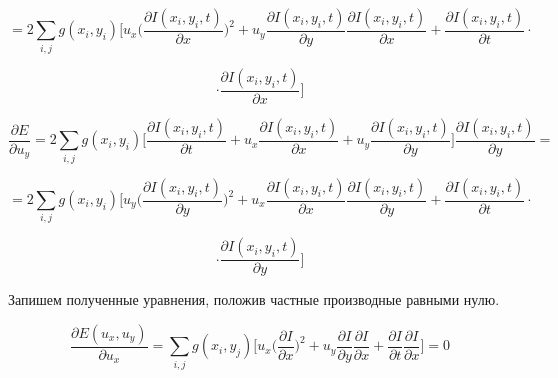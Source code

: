 \documentclass[a4paper,14pt]{extarticle}
\begin{document}
\begin{displaymath}
    =2\sum_{i,j}g(x_i,y_i)\Big[u_x\Big(\frac{\partial I(x_i,y_i,t)}{\partial x}\Big)^2 + u_y\frac{\partial I(x_i,y_i,t)}{\partial y}\frac{\partial I(x_i,y_i,t)}{\partial x} + \frac{\partial I(x_i,y_i,t)}{\partial t} \cdot
\end{displaymath}

\begin{displaymath}
    \cdot \frac{\partial I(x_i,y_i,t)}{\partial x}\Big]
\end{displaymath}




\begin{equation}
    \frac{\partial E}{\partial u_y} = 2\sum_{i,j} g(x_i,y_i)\Big[\frac{\partial I(x_i,y_i,t)}{\partial t} + u_x \frac{\partial I(x_i,y_i,t)}{\partial x} + u_y \frac{\partial I(x_i,y_i,t)}{\partial y}\Big] \frac{\partial I(x_i,y_i,t)}{\partial y}= 
\end{equation}

\begin{displaymath}
    =2\sum_{i,j}g(x_i,y_i)\Big[u_y\Big(\frac{\partial I(x_i,y_i,t)}{\partial y}\Big)^2 + u_x\frac{\partial I(x_i,y_i,t)}{\partial x}\frac{\partial I(x_i,y_i,t)}{\partial y} + \frac{\partial I(x_i,y_i,t)}{\partial t} \cdot
\end{displaymath}

\begin{displaymath}
    \cdot \frac{\partial I(x_i,y_i,t)}{\partial y}\Big]
\end{displaymath}

Запишем полученные уравнения, положив частные производные равными нулю.

\begin{displaymath}
   \frac{\partial E(u_x,u_y)}{\partial u_x} = \sum_{i,j}g(x_i,y_j)\Big[ u_x \Big( \frac{\partial I}{\partial x}\Big)^2 + u_y \frac{\partial I}{\partial y} \frac{\partial I}{\partial x} + \frac{\partial I}{\partial t}\frac{\partial I}{\partial x}\Big] = 0
\end{displaymath}
\end{document}
